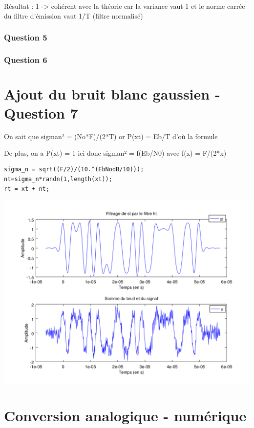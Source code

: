 \documentclass{acm_proc_article-sp}
\begin{document}
Résultat : 1 -> cohérent avec la théorie car la variance vaut 1 et le norme carrée du filtre d'émission vaut 1/T (filtre normalisé)

\subsubsection{Question 5}

\subsubsection{Question 6}


\section{Ajout du bruit blanc gaussien - Question 7}

On sait que sigman² = (No*F)/(2*T)
or P(xt) = Eb/T d'où la formule

De plus, on a P(xt) = 1 ici donc sigman² = f(Eb/N0) avec f(x) = F/(2*x)

\begin{lstlisting}
sigma_n = sqrt((F/2)/(10.^(EbNodB/10)));
nt=sigma_n*randn(1,length(xt));
rt = xt + nt;
\end{lstlisting}

\begin{center}
\includegraphics[scale=0.45]{signalBruite_7.png}
\end{center}


\section{Conversion analogique - numérique}
\end{document}

